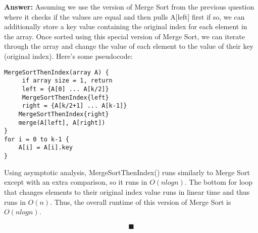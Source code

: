 \documentclass[a4paper,12pt]{article}
\begin{document}
\textbf{Answer:} Assuming we use the version of Merge Sort from the previous question where it checks if the values are equal and then pulls A[left] first if so, we can additionally store a key value containing the original index for each element in the array. Once sorted using this special version of Merge Sort, we can iterate through the array and change the value of each element to the value of their key (original index). Here's some pseudocode:\\

\begin{verbatim}
MergeSortThenIndex(array A) {
     if array size = 1, return
     left = {A[0] ... A[k/2]}
     MergeSortThenIndex{left}
     right = {A[k/2+1] ... A[k-1]}
    MergeSortThenIndex{right}
    merge(A[left], A[right])
}
for i = 0 to k-1 {
    A[i] = A[i].key
}
\end{verbatim}

Using asymptotic analysis, MergeSortThenIndex() runs similarly to Merge Sort except with an extra comparison, so it runs in $O(nlogn)$. The bottom for loop that changes elements to their original index value runs in linear time and thus runs in $O(n)$. Thus, the overall runtime of this version of Merge Sort is $O(nlogn)$.

$$\blacksquare$$\\
\end{document}
